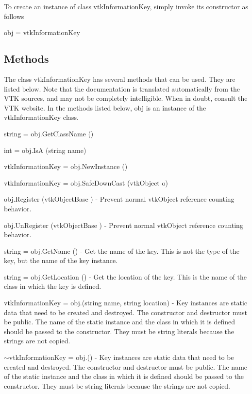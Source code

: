 To create an instance of class vtk\-Information\-Key, simply invoke its constructor as follows \begin{DoxyVerb}  obj = vtkInformationKey
\end{DoxyVerb}
 \hypertarget{vtkwidgets_vtkxyplotwidget_Methods}{}\subsection{Methods}\label{vtkwidgets_vtkxyplotwidget_Methods}
The class vtk\-Information\-Key has several methods that can be used. They are listed below. Note that the documentation is translated automatically from the V\-T\-K sources, and may not be completely intelligible. When in doubt, consult the V\-T\-K website. In the methods listed below, {\ttfamily obj} is an instance of the vtk\-Information\-Key class. 
\begin{DoxyItemize}
\item {\ttfamily string = obj.\-Get\-Class\-Name ()}  
\item {\ttfamily int = obj.\-Is\-A (string name)}  
\item {\ttfamily vtk\-Information\-Key = obj.\-New\-Instance ()}  
\item {\ttfamily vtk\-Information\-Key = obj.\-Safe\-Down\-Cast (vtk\-Object o)}  
\item {\ttfamily obj.\-Register (vtk\-Object\-Base )} -\/ Prevent normal vtk\-Object reference counting behavior.  
\item {\ttfamily obj.\-Un\-Register (vtk\-Object\-Base )} -\/ Prevent normal vtk\-Object reference counting behavior.  
\item {\ttfamily string = obj.\-Get\-Name ()} -\/ Get the name of the key. This is not the type of the key, but the name of the key instance.  
\item {\ttfamily string = obj.\-Get\-Location ()} -\/ Get the location of the key. This is the name of the class in which the key is defined.  
\item {\ttfamily vtk\-Information\-Key = obj.(string name, string location)} -\/ Key instances are static data that need to be created and destroyed. The constructor and destructor must be public. The name of the static instance and the class in which it is defined should be passed to the constructor. They must be string literals because the strings are not copied.  
\item {\ttfamily $\sim$vtk\-Information\-Key = obj.()} -\/ Key instances are static data that need to be created and destroyed. The constructor and destructor must be public. The name of the static instance and the class in which it is defined should be passed to the constructor. They must be string literals because the strings are not copied.  

\end{DoxyItemize}

